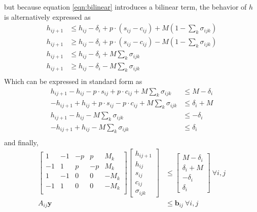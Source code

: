 but because equation \ref{eqn:bilinear} introduces a bilinear term, the behavior of $h$ is alternatively expressed as
\begin{equation} \begin{aligned}
	h_{ij+1} & \le h_{ij} - \delta_i + p\cdot(s_{ij} - c_{ij}) + M(1 - \sum_k\sigma_{ijk})\\
	h_{ij+1} & \ge h_{ij} - \delta_i + p\cdot(s_{ij} - c_{ij}) - M(1 - \sum_k\sigma_{ijk})\\
	h_{ij+1} & \le h_{ij} - \delta_i + M\sum_k\sigma_{ijk}\\
	h_{ij+1} & \ge h_{ij} - \delta_i - M\sum_k\sigma_{ijk}\\
\end{aligned} \end{equation}
Which can be expressed in standard form as
\begin{equation} \begin{aligned}
	 h_{ij+1} - h_{ij} - p\cdot s_{ij} + p\cdot c_{ij} + M\sum_k\sigma_{ijk} &\le M - \delta_i \\ 
	-h_{ij+1} + h_{ij} + p\cdot s_{ij} - p\cdot c_{ij} + M\sum_k\sigma_{ijk} &\le \delta_i + M \\
	 h_{ij+1} - h_{ij} - M\sum_k\sigma_{ijk} &\le -\delta_i \\
	-h_{ij+1} + h_{ij} - M\sum_k\sigma_{ijk} & \le \delta_i \\
\end{aligned} \end{equation}
and finally,
\begin{equation} \label{eqn:socDynamic1} \begin{aligned}
	\begin{bmatrix}1  & -1 & -p & p   & M_k \\
		       -1 & 1  & p  & -p  & M_k \\
		       1  & -1 & 0             & 0              & -M_k  \\
		       -1 & 1  & 0             & 0              & -M_k  \\
	\end{bmatrix}
	\begin{bmatrix}h_{ij+1} \\ h_{ij} \\ s_{ij} \\ c_{ij} \\ \sigma_{ijk} \end{bmatrix} &\le 
		\begin{bmatrix}M -\delta_i \\ \delta_i + M \\ -\delta_i \\ \delta_i \end{bmatrix} \ \forall i,j \\
			A_{ij}\mathbf{y} &\le \mathbf{b}_{ij} \ \forall i,j
\end{aligned} \end{equation}
